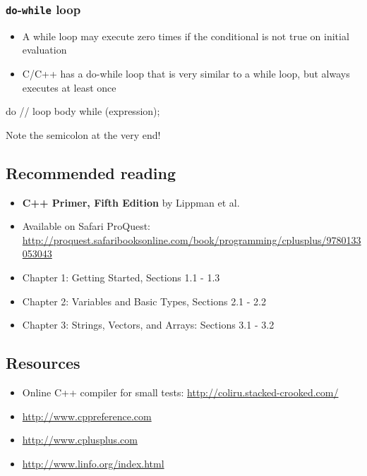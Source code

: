 \documentclass[12pt,letterpaper,twoside]{article}
\begin{document}
\subsubsection{\texorpdfstring{\texttt{do}-\texttt{while} loop}{do-while loop}}
\begin{itemize}
\item
  A while loop may execute zero times if the conditional is not true on
  initial evaluation
\item
  C/C++ has a do-while loop that is very similar to a while loop, but
  always executes at least once
\end{itemize}

\begin{cpp}
do {
  // loop body
} while (expression);
\end{cpp}

Note the semicolon at the very end!

\subsection{Recommended reading}
\begin{itemize}
\item
  \textbf{C++ Primer, Fifth Edition} by Lippman et al.
\item
  Available on Safari ProQuest:
  \url{http://proquest.safaribooksonline.com/book/programming/cplusplus/9780133053043}
\item
  Chapter 1: Getting Started, Sections 1.1 - 1.3
\item
  Chapter 2: Variables and Basic Types, Sections 2.1 - 2.2
\item
  Chapter 3: Strings, Vectors, and Arrays: Sections 3.1 - 3.2
\end{itemize}

\hypertarget{resources}{%
\subsection{Resources}\label{resources}}

\begin{itemize}
\item
  Online C++ compiler for small tests:
  \url{http://coliru.stacked-crooked.com/}
\item
  \url{http://www.cppreference.com}
\item
  \url{http://www.cplusplus.com}
\item
  \url{http://www.linfo.org/index.html}
\end{itemize}
\end{document}
